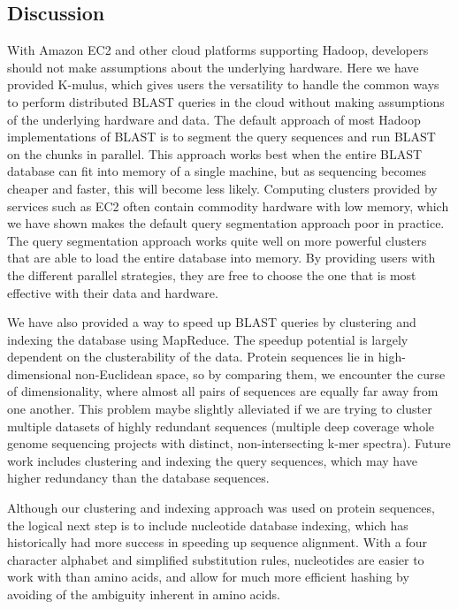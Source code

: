 \documentclass[12pt,\mydriver]{thesis}
\begin{document}
\subsection{Discussion}

With Amazon EC2 and other cloud platforms supporting Hadoop, developers should not make assumptions about the underlying hardware.
Here we have provided K-mulus, which gives users the versatility to handle the common ways to perform distributed BLAST queries in the cloud without making assumptions of the underlying hardware and data.
The default approach of most Hadoop implementations of BLAST is to segment the query sequences and run BLAST on the chunks in parallel.
This approach works best when the entire BLAST database can fit into memory of a single machine, but as sequencing becomes cheaper and faster, this will become less likely.
Computing clusters provided by services such as EC2 often contain commodity hardware with low memory, which we have shown makes the default query segmentation approach poor in practice.
The query segmentation approach works quite well on more powerful clusters that are able to load the entire database into memory.
By providing users with the different parallel strategies, they are free to choose the one that is most effective with their data and hardware.

We have also provided a way to speed up BLAST queries by clustering and indexing the database using MapReduce.
The speedup potential is largely dependent on the clusterability of the data.
Protein sequences lie in high-dimensional non-Euclidean space, so by comparing them, we encounter the curse of dimensionality, where almost all pairs of sequences are equally far away from one another.
This problem maybe slightly alleviated if we are trying to cluster multiple datasets of highly redundant sequences (multiple deep coverage whole genome sequencing projects with distinct, non-intersecting k-mer spectra).
Future work includes clustering and indexing the query sequences, which may have higher redundancy than the database sequences.



Although our clustering and indexing approach was used on protein sequences, the logical next step is to include nucleotide database indexing, which has historically had more success in speeding up sequence alignment\cite{kent2002blat}.
With a four character alphabet and simplified substitution rules, nucleotides are easier to work with than amino acids, and allow for much more efficient hashing by avoiding of the ambiguity inherent in amino acids.
\end{document}
